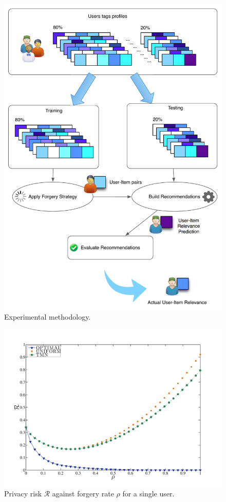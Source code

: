 \begin{figure}[htb]  
\includegraphics[width=\textwidth]{figures/strategy.pdf}
\caption[Experimental methodology.]{Experimental methodology.}
\label{fig:methodology}
\end{figure}

\begin{figure}[htb]  
\includegraphics[width=\textwidth]{figures/Fig4b.pdf}
\caption[Privacy risk against forgery rate for a single user.]{Privacy risk $\mathcal{R}$ against forgery rate $\rho$ for a single user.}
\label{fig:Risk-Rho-Single}
\end{figure}

